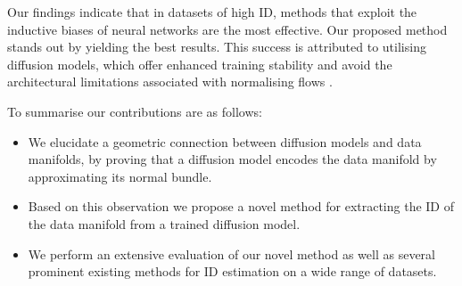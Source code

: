 Our findings indicate that in datasets of high ID, methods that exploit the inductive biases of neural networks are the most effective. Our proposed method stands out by yielding the best results. This success is attributed to utilising diffusion models, which offer enhanced training stability and avoid the architectural limitations associated with normalising flows \cite{behrmann2021understandin}.

To summarise our contributions are as follows:
\begin{itemize}
    \item We elucidate a geometric connection between diffusion models and data manifolds, by proving that a diffusion model encodes the data manifold by approximating its normal bundle.
    \item Based on this observation we propose a novel method for extracting the ID of the data manifold from a trained diffusion model.
    \item We perform an extensive evaluation of our novel method as well as several prominent existing methods for ID estimation on a wide range of datasets.
\end{itemize}

